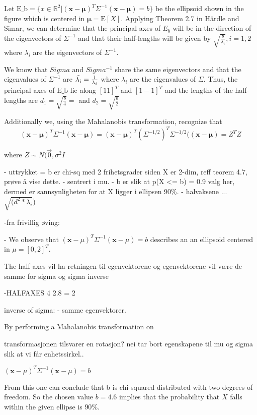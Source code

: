 Let $\text{E_b} = \{ x \in \mathbb{R}^2 | (\mathbf{x}- \mathbf{\mu})^T\Sigma^{-1} (\mathbf{x}- \mathbf{\mu}) = b \}$ be the ellipsoid shown in the figure which is centered in $\mathbf{\mu} = \text{E}[X]$. Applying Theorem 2.7 in Härdle and Simar, we can determine that the principal axes of $E_b$ will be in the direction of the eigenvectors of $\Sigma^{-1}$ and that their half-lengths will be given by $\sqrt{\frac{b}{\lambda_i}}, i =1,2$ where $\lambda_i$ are the eigenvectors of $\Sigma^{-1}$.  

We know that $Sigma$ and $Sigma^{-1}$ share the same eigenvectors and that the eigenvalues of $\Sigma^{-1}$ are  $\Tilde{\lambda_i}= \frac{1}{{\lambda_i}}$ where $\lambda_i$ are the eigenvalues of $\Sigma$. Thus, the principal axes of $\text{E_b}$ lie along $[1 1]^T$ and $[1 -1]^T$ and the lengths of the half-lengths are $d_1 = \sqrt{\frac{b}{4}} =$ and $d_2 =\sqrt{\frac{b}{2}}$ %

Additionally we, using the Mahalanobis transformation, recognize that 
\begin{equation*}
    (\mathbf{x}- \mathbf{\mu})^T\Sigma^{-1} (\mathbf{x}- \mathbf{\mu})
    = (\mathbf{x}- \mathbf{\mu})^T(\Sigma^{-1/2})^T\Sigma^{-1/2}((\mathbf{x}- \mathbf{\mu}) = Z^TZ
\end{equation*}

where $Z \sim N(\Vec{0}, \sigma^2 I $

- uttrykket = b er chi-sq med 2 frihetsgrader siden X er 2-dim, reff teorem 4.7, prøve å vise dette. 
- sentrert i mu.
- b er slik at p(X <= b) = 0.9 valg her, dermed er sannsynligheten for at X ligger i ellipsen 90\%. 
- halvaksene ... $\sqrt{(d^2 * \lambda_i}$) 


-fra frivillig øving: 

- 
We observe that $(\textbf{x}- {\mu})^T \Sigma^{-1} (\textbf{x}-{\mu})=b$ describes an an ellipsoid centered in $\mu = [0, 2]^T$. 

The half axes vil ha retningen til egenvektorene og 
egenvektorene vil være de samme for sigma og sigma inverse 

-HALFAXES
4
2.8 = 2

inverse of sigma:
- samme egenvektorer.

By performing a Mahalanobis transformation on 

transformasjonen tilsvarer en rotasjon?
nei tar bort egenskapene til mu og sigma slik at vi får enhetssirkel..

$(\textbf{x}- {\mu})^T \Sigma^{-1} (\textbf{x}-{\mu})=b$ %

From this one can conclude that b is chi-squared distributed with two degrees of freedom. So the chosen value $b=4.6$ implies that the probability that $X$ falls within the given ellipse is $90\%$. 